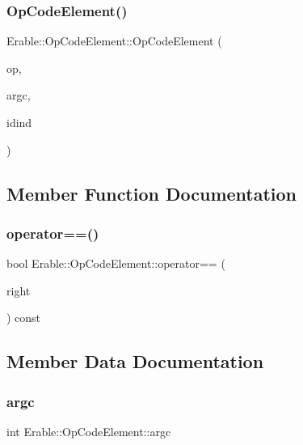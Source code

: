 \subsubsection{\texorpdfstring{OpCodeElement()}{OpCodeElement()}}
{\footnotesize\ttfamily Erable\+::\+Op\+Code\+Element\+::\+Op\+Code\+Element (\begin{DoxyParamCaption}\item[{std\+::string}]{op,  }\item[{int}]{argc,  }\item[{int}]{idind }\end{DoxyParamCaption})\hspace{0.3cm}{\ttfamily [inline]}}



\subsection{Member Function Documentation}
\mbox{\label{class_erable_1_1_op_code_element_a0d23124dd1f0b042ad9a294919328e5e}} 
\subsubsection{\texorpdfstring{operator==()}{operator==()}}
{\footnotesize\ttfamily bool Erable\+::\+Op\+Code\+Element\+::operator== (\begin{DoxyParamCaption}\item[{const \mbox{\hyperlink{class_erable_1_1_op_code_element}{Op\+Code\+Element}} \&}]{right }\end{DoxyParamCaption}) const\hspace{0.3cm}{\ttfamily [inline]}}



\subsection{Member Data Documentation}
\mbox{\label{class_erable_1_1_op_code_element_a5fc2d06352c6a4e09bce876b60a28434}} 
\subsubsection{\texorpdfstring{argc}{argc}}
{\footnotesize\ttfamily int Erable\+::\+Op\+Code\+Element\+::argc}

